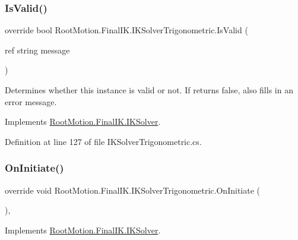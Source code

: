 \subsubsection{\texorpdfstring{Is\+Valid()}{IsValid()}}
{\footnotesize\ttfamily override bool Root\+Motion.\+Final\+I\+K.\+I\+K\+Solver\+Trigonometric.\+Is\+Valid (\begin{DoxyParamCaption}\item[{ref string}]{message }\end{DoxyParamCaption})\hspace{0.3cm}{\ttfamily [virtual]}}



Determines whether this instance is valid or not. If returns false, also fills in an error message. 



Implements \mbox{\hyperlink{class_root_motion_1_1_final_i_k_1_1_i_k_solver_a6ccc7496e7f4e95668e1c1bdaa051d67}{Root\+Motion.\+Final\+I\+K.\+I\+K\+Solver}}.



Definition at line 127 of file I\+K\+Solver\+Trigonometric.\+cs.

\mbox{\label{class_root_motion_1_1_final_i_k_1_1_i_k_solver_trigonometric_a57ee7178a992a1a4e32387f19af6227f}} 
\subsubsection{\texorpdfstring{On\+Initiate()}{OnInitiate()}}
{\footnotesize\ttfamily override void Root\+Motion.\+Final\+I\+K.\+I\+K\+Solver\+Trigonometric.\+On\+Initiate (\begin{DoxyParamCaption}{ }\end{DoxyParamCaption})\hspace{0.3cm}{\ttfamily [protected]}, {\ttfamily [virtual]}}



Implements \mbox{\hyperlink{class_root_motion_1_1_final_i_k_1_1_i_k_solver_a2a8cbf1dfed274fdbc79ff011c468cc6}{Root\+Motion.\+Final\+I\+K.\+I\+K\+Solver}}.



